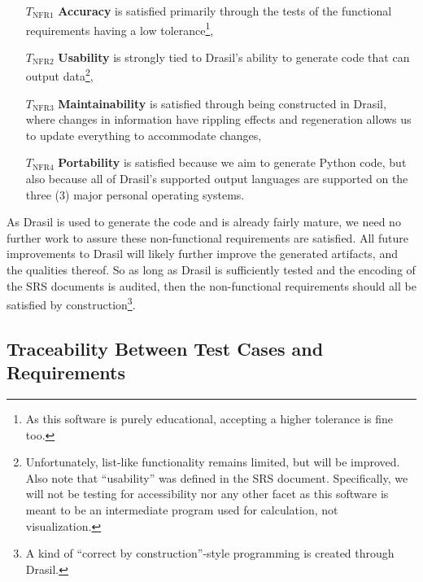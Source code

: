\documentclass[12pt, titlepage]{article}
\begin{document}
\begin{enumerate}

    \item[$T_\text{NFR1}$] \textbf{Accuracy} is satisfied primarily through the
                tests of the functional requirements having a low
                tolerance\footnote{As this software is purely educational,
                accepting a higher tolerance is fine too.},

    \item[$T_\text{NFR2}$] \textbf{Usability} is strongly tied to Drasil's
                ability to generate code that can output
                data\footnote{Unfortunately, list-like functionality remains
                limited, but will be improved. Also note that ``usability'' was
                defined in the SRS document. Specifically, we will not be
                testing for accessibility nor any other facet as this software
                is meant to be an intermediate program used for calculation, not
                visualization.},

    \item[$T_\text{NFR3}$] \textbf{Maintainability} is satisfied through being
                constructed in Drasil, where changes in information have
                rippling effects and regeneration allows us to update everything
                to accommodate changes,

    \item[$T_\text{NFR4}$] \textbf{Portability} is satisfied because we aim to
                generate Python code, but also because all of Drasil's supported
                output languages are supported on the three (3) major personal
                operating systems.

\end{enumerate}

As Drasil is used to generate the code and is already fairly mature, we need no
further work to assure these non-functional requirements are satisfied. All
future improvements to Drasil will likely further improve the generated
artifacts, and the qualities thereof. So as long as Drasil is sufficiently
tested and the encoding of the SRS documents is audited, then the non-functional
requirements should all be satisfied by construction\footnote{A kind of
``correct by construction''-style programming is created through Drasil.}.

\subsection{Traceability Between Test Cases and Requirements}
\end{document}
